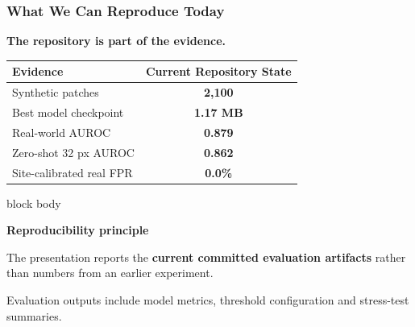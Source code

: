 \documentclass[aspectratio=169,11pt]{beamer}
\newcommand{\emphred}[1]{\textcolor{secondary}{#1}}
\newcommand{\emphhighlight}[1]{\textcolor{primary}{\textbf{#1}}}
\newcommand{\good}[1]{\textcolor{accent}{\textbf{#1}}}
\begin{document}
\begin{frame}\frametitle{\emphred{What We Can Reproduce Today}}

\begin{center}

{\normalsize
\textbf{The repository is part of the evidence.}}

\vspace{0.25cm}

\small
\begin{tabular}{|l|c|}
\hline
\textbf{Evidence} & \textbf{Current Repository State} \\
\hline
Synthetic patches & \good{2,100} \\
\hline
Best model checkpoint & \good{1.17 MB} \\
\hline
Real-world AUROC & \good{0.879} \\
\hline
Zero-shot 32 px AUROC & \good{0.862} \\
\hline
Site-calibrated real FPR & \good{0.0\%} \\
\hline
\end{tabular}

\vspace{0.3cm}

\begin{beamercolorbox}[
    wd=0.9\paperwidth,
    rounded=true,
    shadow=true,
    sep=0.45em
  ]{block body}
\begin{center}
\footnotesize
\textbf{Reproducibility principle}

The presentation reports the
\emphhighlight{current committed evaluation artifacts}
rather than numbers from an earlier experiment.
\end{center}
\end{beamercolorbox}

\vspace{0.2cm}

\footnotesize
Evaluation outputs include model metrics,
threshold configuration and stress-test summaries.

\end{center}

\end{frame}
\end{document}
